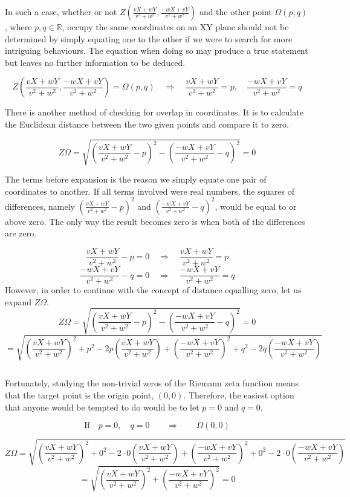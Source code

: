 \documentclass{amsart}
\begin{document}
	In such a case, whether or not $Z(\frac{vX+wY}{v^2+w^2},\frac{-wX+vY}{v^2+w^2})$ and the other point $\Omega(p,q)$, where $p,q \in \mathbb{R}$, occupy the same coordinates on an XY plane should not be determined by simply equating one to the other if we were to search for more intriguing behaviours. The equation when doing so may produce a true statement but leaves no further information to be deduced.
	
	\[ Z(\frac{vX+wY}{v^2+w^2},\frac{-wX+vY}{v^2+w^2}) = \Omega(p,q) \quad \Rightarrow \quad \frac{vX+wY}{v^2+w^2}=p, \quad \frac{-wX+vY}{v^2+w^2}=q \]
		
	There is another method of checking for overlap in coordinates. It is to calculate the Euclidean distance between the two given points and compare it to zero.
	
	\[ Z\Omega = \sqrt{(\frac{vX+wY}{v^2+w^2}-p)^2 - (\frac{-wX+vY}{v^2+w^2}-q)^2} = 0 \]
	
	The terms before expansion is the reason we simply equate one pair of coordinates to another. If all terms involved were real numbers, the squares of differences, namely $(\frac{vX+wY}{v^2+w^2}-p)^2$ and $(\frac{-wX+vY}{v^2+w^2}-q)^2$, would be equal to or above zero. The only way the result becomes zero is when both of the differences are zero.
	
	\[ \frac{vX+wY}{v^2+w^2}-p=0 \quad \Rightarrow \quad \frac{vX+wY}{v^2+w^2} = p  \]
	\[\]
	\[ \frac{-wX+vY}{v^2+w^2}-q=0 \quad \Rightarrow \quad \frac{-wX+vY}{v^2+w^2} = q  \]
	\[\]
	However, in order to continue with the concept of distance equalling zero, let us expand $Z\Omega$.
	\[ Z\Omega = \sqrt{(\frac{vX+wY}{v^2+w^2}-p)^2 - (\frac{-wX+vY}{v^2+w^2}-q)^2} = 0 \]
	\[\]
	\[ = \sqrt{  (\frac{vX+wY}{v^2+w^2})^2 + p^2 -2p(\frac{vX+wY}{v^2+w^2}) + (\frac{-wX+vY}{v^2+w^2})^2 + q^2 -2q(\frac{-wX+vY}{v^2+w^2}) } \]
	
	\[\]
		
	Fortunately, studying the non-trivial zeros of the Riemann zeta function means that the target point is the origin point, $(0, 0)$. Therefore, the easiest option that anyone would be tempted to do would be to let $p=0$ and $q=0$.
	
	\[ \text{If} \quad p=0, \quad q=0 \qquad \Rightarrow \qquad \Omega(0,0) \]
	
	\[ Z\Omega = \sqrt{  (\frac{vX{+}wY}{v^2{+}w^2})^2 {+} 0^2 {-} 2 {\cdot} 0 (\frac{vX{+}wY}{v^2{+}w^2}) {+} (\frac{-wX{+}vY}{v^2{+}w^2})^2 {+} 0^2 {-} 2 {\cdot} 0 (\frac{-wX{+}vY}{v^2{+}w^2}) } \]
	\[\]
	\[ = \sqrt{(\frac{vX{+}wY}{v^2{+}w^2})^2 + (\frac{-wX{+}vY}{v^2{+}w^2})^2} = 0 \]
	
\end{document}
